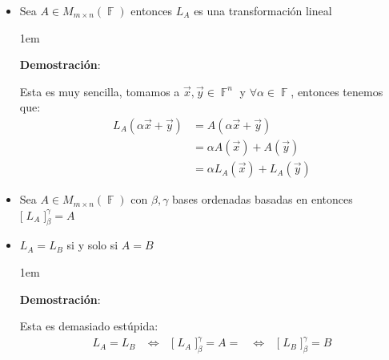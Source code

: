 \documentclass[12pt, fleqn]{report}                             %
\newenvironment{SmallIndentation}[1][0.75em]                    %
        {\begin{adjustwidth}{#1}{}\begin{footnotesize}}             %
        {\end{footnotesize}\end{adjustwidth}}                       %
\DeclareMathOperator \Space     {\quad}                         %
\DeclareMathOperator \MiniSpace {\;}                            %
\theoremstyle{break}                                            %
\newcommand \lEqual  {\MiniSpace \Leftrightarrow \MiniSpace}    %
\DeclareMathOperator \GenericField {\mathbb{F}}                 %
\newcommand{\BigBrackets}[1]    {\Big[ \; #1 \; \Big]}          %
\begin{document}
                \begin{itemize}
                    
                    \item 
                        Sea $A \in M_{m \times n}(\GenericField)$ entonces $L_A$
                        es una transformación lineal

                        \begin{SmallIndentation}[1em]
                            \textbf{Demostración}:
                            
                            Esta es muy sencilla, tomamos a $\vec x, \vec y \in \GenericField^n$
                            y $\forall \alpha \in \GenericField$, entonces tenemos que:
                            \begin{align*}
                                L_A(\alpha \vec x + \vec y)
                                    &= A(\alpha \vec x + \vec y)        \\
                                    &= \alpha A(\vec x) + A(\vec y)     \\
                                    &= \alpha L_A(\vec x) + L_A(\vec y)
                            \end{align*}
                        
                        \end{SmallIndentation}
                            

                    \item
                        Sea $A \in M_{m \times n}(\GenericField)$ con $\beta, \gamma$
                        bases ordenadas basadas en  entonces 
                        $\BigBrackets{L_A}_\beta^\gamma = A$

                    \item
                        $L_A = L_B$ si y solo si $A = B$

                        \begin{SmallIndentation}[1em]
                            \textbf{Demostración}:
                            
                            Esta es demasiado estúpida:
                            \begin{align*}
                                L_A = L_B
                                \lEqual \BigBrackets{L_A}_\beta^\gamma 
                                = A =
                                \lEqual \BigBrackets{L_B}_\beta^\gamma 
                                = B
                            \end{align*}
                        

\end{SmallIndentation}
\end{itemize}
\end{document}

